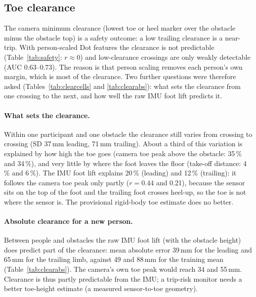 \subsection{Toe clearance}
\label{sec:res-clearance}

The camera minimum clearance (lowest toe or heel marker over the obstacle minus the obstacle top) is a safety outcome: a low
trailing clearance is a near-trip. With person-scaled Dot features the clearance is not predictable (Table~\ref{tab:safety}:
$r \approx 0$) and low-clearance crossings are only weakly detectable (AUC 0.63--0.73). The reason is that person scaling removes
each person's own margin, which is most of the clearance. Two further questions were therefore asked (Tables~\ref{tab:clearcells}
and \ref{tab:clearabs}): what sets the clearance from one crossing to the next, and how well the raw IMU foot lift predicts it.

\begin{table}[htbp]
\centering
\caption{Clearance from person-scaled Dot features (random forest): regression and detection of low-clearance crossings.}
\label{tab:safety}

\end{table}

\paragraph{What sets the clearance.} Within one participant and one obstacle the clearance still varies from crossing to crossing
(SD 37\,mm leading, 71\,mm trailing). About a third of this variation is explained by how high the toe goes (camera toe peak
above the obstacle: 35\,\% and 34\,\%), and very little by where the foot leaves the floor (take-off distance: 4\,\% and 6\,\%).
The IMU foot lift explains 20\,\% (leading) and 12\,\% (trailing): it follows the camera toe peak only partly ($r = 0.44$ and
0.21), because the sensor sits on the top of the foot and the trailing foot crosses heel-up, so the toe is not where the sensor
is. The provisional rigid-body toe estimate does no better.

\begin{table}[htbp]
\centering
\caption{What sets the crossing-to-crossing clearance (within participant $\times$ obstacle cells): SDs, correlations with the
clearance, and the share of the clearance variance explained.}
\label{tab:clearcells}

\end{table}

\paragraph{Absolute clearance for a new person.} Between people and obstacles the raw IMU foot lift (with the obstacle height) does
predict part of the clearance: mean absolute error 39\,mm for the leading and 65\,mm for the trailing limb, against 49 and 88\,mm for
the training mean (Table~\ref{tab:clearabs}). The camera's own toe peak would reach 34 and 55\,mm. Clearance is thus partly
predictable from the IMU; a trip-risk monitor needs a better toe-height estimate (a measured sensor-to-toe geometry).

\begin{table}[htbp]
\centering
\caption{Absolute clearance of a left-out participant (ordinary least squares): mean absolute error and correlation.}
\label{tab:clearabs}

\end{table}
